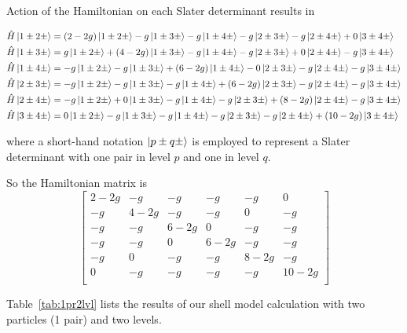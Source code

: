 \documentclass[11pt]{article}
\begin{document}

Action of the Hamiltonian on each Slater determinant results in

\begin{align*}
&\hat{H}\ket{1\pm2\pm}=(2-2g)\ket{1\pm2\pm}-g\ket{1\pm3\pm}-g\ket{1\pm4\pm}-g\ket{2\pm3\pm}-g\ket{2\pm4\pm}+0\ket{3\pm4\pm}   \\
&\hat{H}\ket{1\pm3\pm}=g\ket{1\pm2\pm}+(4-2g)\ket{1\pm3\pm}-g\ket{1\pm4\pm}-g\ket{2\pm3\pm}+0\ket{2\pm4\pm}-g\ket{3\pm4\pm}   \\
&\hat{H}\ket{1\pm4\pm}=-g\ket{1\pm2\pm}-g\ket{1\pm3\pm}+(6-2g)\ket{1\pm4\pm}-0\ket{2\pm3\pm}-g\ket{2\pm4\pm}-g\ket{3\pm4\pm}   \\
&\hat{H}\ket{2\pm3\pm}=-g\ket{1\pm2\pm}-g\ket{1\pm3\pm}-g\ket{1\pm4\pm}+(6-2g)\ket{2\pm3\pm}-g\ket{2\pm4\pm}-g\ket{3\pm4\pm}   \\ 
&\hat{H}\ket{2\pm4\pm}=-g\ket{1\pm2\pm}+0\ket{1\pm3\pm}-g\ket{1\pm4\pm}-g\ket{2\pm3\pm}+(8-2g)\ket{2\pm4\pm}-g\ket{3\pm4\pm}   \\
&\hat{H}\ket{3\pm4\pm}=0\ket{1\pm2\pm}-g\ket{1\pm3\pm}-g\ket{1\pm4\pm}-g\ket{2\pm3\pm}-g\ket{2\pm4\pm}+(10-2g)\ket{3\pm4\pm}   
\end{align*}


where a short-hand notation $\ket{p \pm q \pm}$ is employed to represent a Slater determinant with one pair in level $p$ and one in level $q$.

So the Hamiltonian matrix is
\[
\begin{bmatrix}
2-2g   &  -g   &   -g   &   -g    &   -g    &    0    \\
  -g   &4-2g   &   -g   &   -g    &    0    &   -g    \\
  -g   &  -g   & 6-2g   &    0    &   -g    &   -g    \\
  -g   &  -g   &   0   & 6-2g    &   -g    &   -g    \\
  -g   &   0   &   -g   &   -g    & 8-2g    &   -g    \\
   0   &  -g   &   -g   &   -g    &   -g    & 10-2g    \\
\end{bmatrix}
\]



Table~\ref{tab:1pr2lvl} lists the results of our shell model calculation with two particles (1 pair) and two levels.
\end{document}
